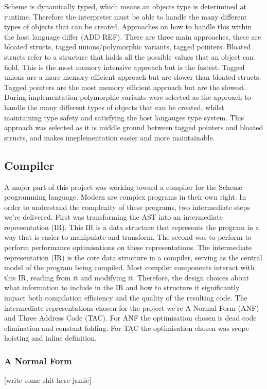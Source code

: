 \documentclass[final]{cmpreport_02}
\begin{document}
Scheme is dynamically typed, which means an objects type is deterimined at runtime. Therefore the interpreter must be able to handle the many different types of objects that can be created. 
Approaches on how to handle this within the host language differ (ADD REF). There are three main approaches, these are bloated structs, tagged unions/polymorphic variants, tagged pointers. 
Bloated structs refer to a structure that holds all the possible values that an object can hold. This is the most memory intensive approach but is the fastest. Tagged unions are a more memory efficient approach but are slower than bloated structs. Tagged pointers are the most memory efficient approach but are the slowest.
During implementation polymorphic variants were selected as the approach to handle the many different types of objects that can be created, whilst maintaining type safety and satisfying the host langauges type system. 
This approach was selected as it is middle ground between tagged pointers and bloated structs, and makes imeplementation easier and more maintainable.

\subsection{Compiler}
A major part of this project was working toward a compiler for the Scheme programming language. Modern are complex programs in their own right. In order to understand the complexity of these programs, two intermediate steps we're delivered.
First was transforming the AST into an intermediate representation (IR). This IR is a data structure that represents the program in a way that is easier to manipulate and transform. The second was to perform to perform performance optimisations on these representations.
The intermediate representation (IR) is the core data structure in a compiler, serving as the central model of the program being compiled. Most compiler components interact with this IR, reading from it and modifying it. Therefore, the design choices about what information to include in the IR and how to structure it significantly impact both compilation efficiency and the quality of the resulting code. \cite{cooper2011engineering}
The intermediate representations chosen for the project we're A Normal Form (ANF) and Three Address Code (TAC). For ANF the optimisation chosen is dead code elimination and constant folding. For TAC the optimisation chosen was scope hoisting and inline definition.

\subsubsection{A Normal Form}
[write some shit here jamie]
\end{document}

